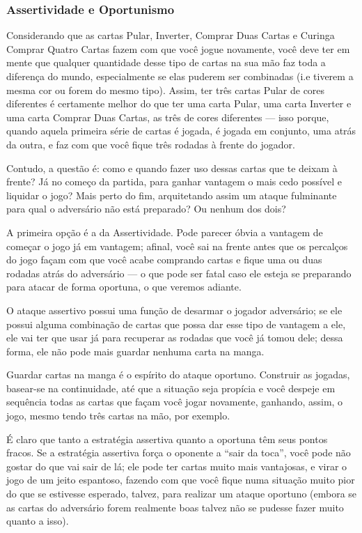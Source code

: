 \subsubsection{Assertividade e Oportunismo}

Considerando que as cartas Pular, Inverter, Comprar Duas Cartas e Curinga Comprar Quatro Cartas fazem com que você jogue novamente, você deve ter em mente que qualquer quantidade desse tipo de cartas na sua mão faz toda a diferença do mundo, especialmente se elas puderem ser combinadas (i.e tiverem a mesma cor ou forem do mesmo tipo). Assim, ter três cartas Pular de cores diferentes é certamente melhor do que ter uma carta Pular, uma carta Inverter e uma carta Comprar Duas Cartas, as três de cores diferentes --- isso porque, quando aquela primeira série de cartas é jogada, é jogada em conjunto, uma atrás da outra, e faz com que você fique três rodadas à frente do jogador.

Contudo, a questão é: como e quando fazer uso dessas cartas que te deixam à frente? Já no começo da partida, para ganhar vantagem o mais cedo possível e liquidar o jogo? Mais perto do fim, arquitetando assim um ataque fulminante para qual o adversário não está preparado? Ou nenhum dos dois?

A primeira opção é a da Assertividade. Pode parecer óbvia a vantagem de começar o jogo já em vantagem; afinal, você sai na frente antes que os percalços do jogo façam com que você acabe comprando cartas e fique uma ou duas rodadas atrás do adversário --- o que pode ser fatal caso ele esteja se preparando para atacar de forma oportuna, o que veremos adiante.

O ataque assertivo possui uma função de desarmar o jogador adversário; se ele possui alguma combinação de cartas que possa dar esse tipo de vantagem a ele, ele vai ter que usar já para recuperar as rodadas que você já tomou dele; dessa forma, ele não pode mais guardar nenhuma carta na manga.

Guardar cartas na manga é o espírito do ataque oportuno. Construir as jogadas, basear-se na continuidade, até que a situação seja propícia e você despeje em sequência todas as cartas que façam você jogar novamente, ganhando, assim, o jogo, mesmo tendo três cartas na mão, por exemplo.

É claro que tanto a estratégia assertiva quanto a oportuna têm seus pontos fracos. Se a estratégia assertiva força o oponente a ``sair da toca'', você pode não gostar do que vai sair de lá; ele pode ter cartas muito mais vantajosas, e virar o jogo de um jeito espantoso, fazendo com que você fique numa situação muito pior do que se estivesse esperado, talvez, para realizar um ataque oportuno (embora se as cartas do adversário forem realmente boas talvez não se pudesse fazer muito quanto a isso).

